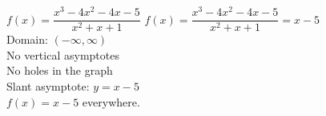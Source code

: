 {$f(x) = \dfrac{x^3-4x^2-4x-5}{x^2+x+1}$}
{$f(x) = \dfrac{x^3-4x^2-4x-5}{x^2+x+1} = x-5$\\
Domain: $(-\infty, \infty)$\\
No vertical asymptotes \\
No holes in the graph \\
Slant asymptote:  $y = x-5$ \\
$f(x) = x-5$ everywhere.}